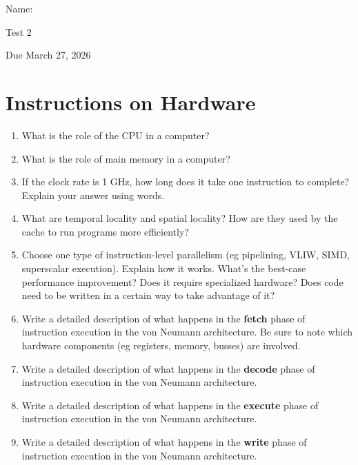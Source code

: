\documentclass[12pt]{article}
\begin{document}
Name: \makebox[3in]{\hrulefill
\hrulefill}

\vfill

\begin{center}
{\huge Test 2}

{\large Due March 27, 2026}
\end{center}

\testrules

\vfill

\pledge

\newpage

\section*{Instructions on Hardware}


\begin{enumerate}
\item What is the role of the CPU in a computer?
\vfill
\item What is the role of main memory in a computer?
\vfill
\item If the clock rate is 1 GHz, how long does it take one instruction to complete? Explain your answer using words.
\vfill
\item What are temporal locality and spatial locality? How are they used by the cache to run programs more efficiently?
\vfill
\item Choose one type of instruction-level parallelism (eg pipelining, VLIW, SIMD, superscalar execution). Explain how it works. What's the best-case performance improvement? Does it require specialized hardware? Does code need to be written in a certain way to take advantage of it? 
\vfill

\pagebreak

\item Write a detailed description of what happens in the \textbf{fetch} phase of instruction execution in the von Neumann architecture. Be sure to note which hardware components (eg registers, memory, busses) are involved.
\vfill
\item Write a detailed description of what happens in the \textbf{decode} phase of instruction execution in the von Neumann architecture.
\vfill
\item Write a detailed description of what happens in the \textbf{execute} phase of instruction execution in the von Neumann architecture.
\vfill
\item Write a detailed description of what happens in the \textbf{write} phase of instruction execution in the von Neumann architecture.
\vfill
\end{enumerate}
\end{document}
